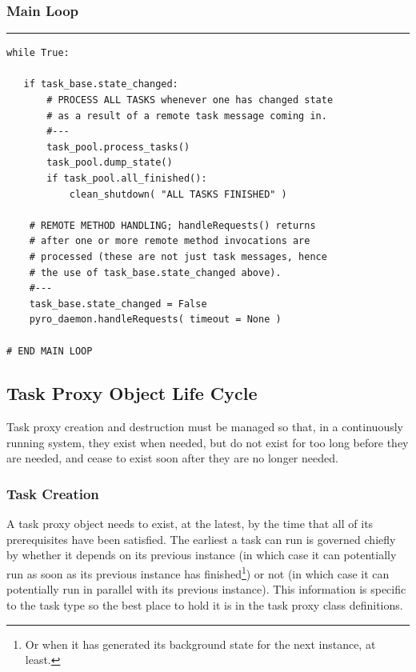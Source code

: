 \documentclass[11pt,a4paper]{article}
\begin{document}
\subsubsection{Main Loop}

{\small
\noindent
\rule{5cm}{.2mm}
\begin{lstlisting}
while True:

   if task_base.state_changed:
       # PROCESS ALL TASKS whenever one has changed state
       # as a result of a remote task message coming in. 
       #---
       task_pool.process_tasks()
       task_pool.dump_state()
       if task_pool.all_finished():
           clean_shutdown( "ALL TASKS FINISHED" )

    # REMOTE METHOD HANDLING; handleRequests() returns 
    # after one or more remote method invocations are 
    # processed (these are not just task messages, hence 
    # the use of task_base.state_changed above).
    #---
    task_base.state_changed = False
    pyro_daemon.handleRequests( timeout = None )

# END MAIN LOOP
\end{lstlisting}
}


\label{sec-task-messaging}


\subsection{Task Proxy Object Life Cycle}

Task proxy creation and destruction must be managed so that, in a
continuously running system, they exist when needed, but do not exist
for too long before they are needed, and cease to exist soon after they
are no longer needed.

\subsubsection{Task Creation}

A task proxy object needs to exist, at the latest, by the time that all
of its prerequisites have been satisfied.  The earliest a task can run
is governed chiefly by whether it depends on its previous
instance (in which case it can potentially run as soon as its previous
instance has finished\footnote{Or when it has generated its background
state for the next instance, at least.}) or not (in which case it can
potentially run in parallel with its previous instance). This
information is specific to the task type so the best place to hold it is
in the task proxy class definitions. 
\end{document}
